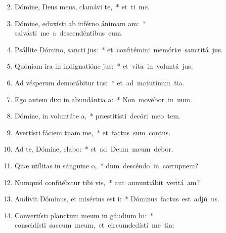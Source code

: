 \begin{flushleft}
\begin{enumerate}[leftmargin=*]
\setcounter{enumi}{1}

\item Dómine, Deus meus, clamávi  te,~* \mbox{et ti me.}

\item Dómine, eduxísti ab inférno ánimam am:~* \mbox{salvásti me a descendéntibus  cum.}

\item Psállite Dómino, sancti jus:~* \mbox{et confitémini memóriæ sanctitá jus.}

\item Quóniam ira in indignatióne jus:~* \mbox{et vita in voluntá jus.}

\item Ad vésperum demorábitur tus:~* \mbox{et ad matutínum tia.}

\item Ego autem dixi in abundántia a:~* \mbox{Non movébor in num.}

\item Dómine, in voluntáte a,~* \mbox{præstitísti decóri meo tem.}

\item Avertísti fáciem tuam  me,~* \mbox{et factus sum contus.}

\item Ad te, Dómine, clabo:~* \mbox{et ad Deum meum debor.}

\item Quæ utílitas in sánguine o,~* \mbox{dum descéndo in corrupnem?}

\item Numquid confitébitur tibi vis,~* \mbox{aut annuntiábit veritá am?}

\item Audívit Dóminus, et misértus est i:~* \mbox{Dóminus factus est adjú us.}

\item Convertísti planctum meum in gáudium hi:~* \mbox{conscidísti saccum meum, et circumdedísti me tia:}


\end{enumerate}
\end{flushleft}
